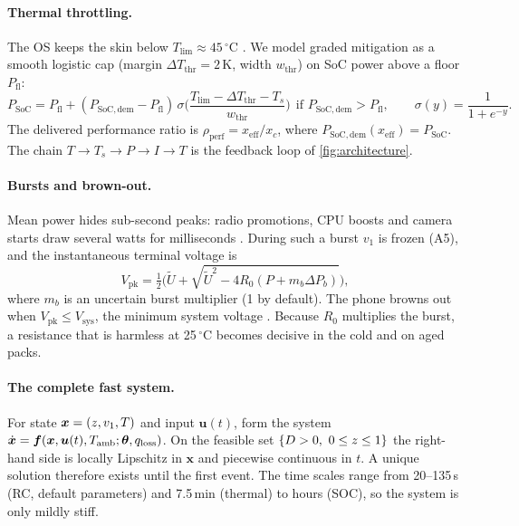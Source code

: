 \paragraph{Thermal throttling.} The OS keeps the skin below $T_{\lim}\approx45\,^\circ$C \cite{CHI15}. We model
graded mitigation \cite{AOSP-TH} as a smooth logistic cap (margin $\Delta T_{\mathrm{thr}}=2$\,K, width
$w_{\mathrm{thr}}$) on SoC power above a floor $P_{\mathrm{fl}}$:
\begin{equation}
  P_{\mathrm{SoC}}=P_{\mathrm{fl}}+(P_{\mathrm{SoC,dem}}-P_{\mathrm{fl}})\,\sigma\!\Big(\frac{T_{\lim}-\Delta T_{\mathrm{thr}}-T_s}{w_{\mathrm{thr}}}\Big)\ \
  \text{if } P_{\mathrm{SoC,dem}}>P_{\mathrm{fl}},\qquad \sigma(y)=\frac1{1+e^{-y}}. \label{eq:throttle}
\end{equation}
The delivered performance ratio is $\rho_{\mathrm{perf}}=x_{\mathrm{eff}}/x_c$, where
$P_{\mathrm{SoC,dem}}(x_{\mathrm{eff}})=P_{\mathrm{SoC}}$. The chain $T\to T_s\to P\to I\to T$ is the feedback
loop of \cref{fig:architecture}.

\paragraph{Bursts and brown-out.} Mean power hides sub-second peaks: radio promotions, CPU boosts and camera starts
draw several watts for milliseconds \cite{HU12,LEE20}. During such a burst $v_1$ is frozen (A5), and the
instantaneous terminal voltage is
\begin{equation}
  V_{\mathrm{pk}}=\tfrac12\Big(\tilde U+\sqrt{\tilde U^2-4R_0(P+m_b\Delta P_b)}\Big), \label{eq:burst}
\end{equation}
where $m_b$ is an uncertain burst multiplier (1 by default). The phone browns out when
$V_{\mathrm{pk}}\le V_{\mathrm{sys}}$, the minimum system voltage \cite{QC-SMB}. Because $R_0$
multiplies the burst, a resistance that is harmless at 25\,$^\circ$C becomes decisive in the cold and on aged
packs.

\paragraph{The complete fast system.} For state $\bm x=(z,v_1,T)$ and input $\bm u(t)$,
\crefrange{eq:current}{eq:throttle} form the system
$\dot{\bm x}=\bm f(\bm x,\bm u(t),T_{\mathrm{amb}};\bm\theta,q_{\mathrm{loss}})$. On the feasible set $\{D>0,\ 0\le z\le1\}$
the right-hand side is locally Lipschitz in $\bm x$ and piecewise continuous in $t$. A unique solution therefore
exists until the first event. The time scales range from 20--135\,s (RC, default parameters) and 7.5\,min
(thermal) to hours (SOC),
so the system is only mildly stiff.

